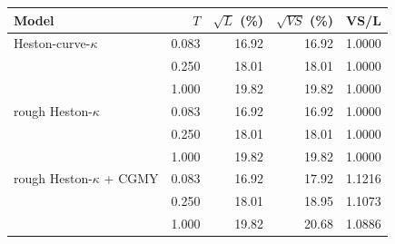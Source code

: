 \begin{tabular}{lrrrr}
\toprule
Model & $T$ & $\sqrt{L}$ (\%) & $\sqrt{VS}$ (\%) & VS/L\\
\midrule
Heston-curve-$\kappa$ & 0.083 & 16.92 & 16.92 & 1.0000\\
 & 0.250 & 18.01 & 18.01 & 1.0000\\
 & 1.000 & 19.82 & 19.82 & 1.0000\\
\addlinespace
rough Heston-$\kappa$ & 0.083 & 16.92 & 16.92 & 1.0000\\
 & 0.250 & 18.01 & 18.01 & 1.0000\\
 & 1.000 & 19.82 & 19.82 & 1.0000\\
\addlinespace
rough Heston-$\kappa$ + CGMY & 0.083 & 16.92 & 17.92 & 1.1216\\
 & 0.250 & 18.01 & 18.95 & 1.1073\\
 & 1.000 & 19.82 & 20.68 & 1.0886\\
\bottomrule
\end{tabular}
